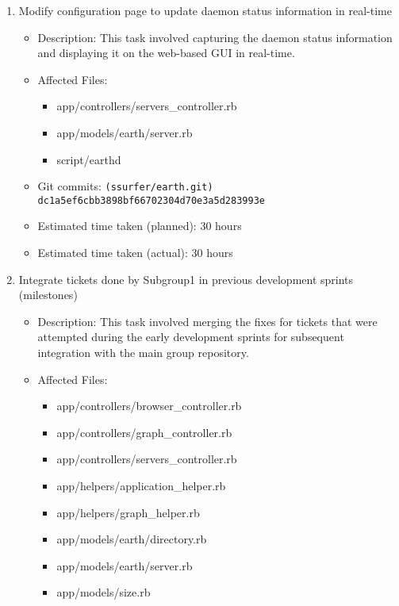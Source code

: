 \begin{enumerate}
    \item Modify configuration page to update daemon status information in real-time
        \begin{itemize}
            \item Description: This task involved capturing the daemon status information and displaying it on the web-based GUI in real-time.
            \item Affected Files:
                \begin{itemize}
                    \item app/controllers/servers\_controller.rb
                    \item app/models/earth/server.rb
                    \item script/earthd
                \end{itemize}
            \item Git commits: \texttt{(ssurfer/earth.git) dc1a5ef6cbb3898bf66702304d70e3a5d283993e}
            \item Estimated time taken (planned): 30 hours
            \item Estimated time taken (actual): 30 hours
        \end{itemize}
    \item Integrate tickets done by Subgroup1 in previous development sprints (milestones)
        \begin{itemize}
            \item Description: This task involved merging the fixes for tickets that were attempted during the early development sprints for subsequent integration with the main group repository.
            \item Affected Files:
                \begin{itemize}
                    \item app/controllers/browser\_controller.rb
                    \item app/controllers/graph\_controller.rb
                    \item app/controllers/servers\_controller.rb
                    \item app/helpers/application\_helper.rb
                    \item app/helpers/graph\_helper.rb
                    \item app/models/earth/directory.rb
                    \item app/models/earth/server.rb
                    \item app/models/size.rb

\end{itemize}
\end{itemize}
\end{enumerate}
